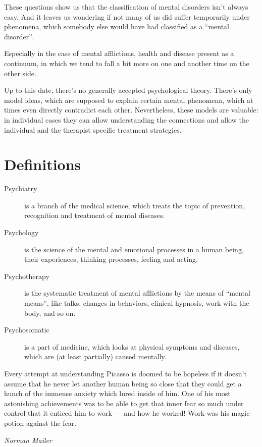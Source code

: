 \documentclass[../main.tex]{subfiles}
\begin{document}
These questions show us that the classification of mental disorders isn't always easy.
And it leaves us wondering if not many of us did suffer temporarily under phenomena,
which somebody else would have had classified as a ``mental disorder''.

Especially in the case of mental afflictions, health and disease present as a continuum,
in which we tend to fall a bit more on one and another time on the other side.

Up to this date, there's no generally accepted psychological theory.
There's only model ideas, which are supposed to explain certain mental phenomena,
which at times even directly contradict each other.
Nevertheless, these models are valuable: in individual cases  they can allow understanding
the connections and allow the individual and the therapist specific treatment strategies.

\section{Definitions}

\begin{description}
\item[Psychiatry] is a branch of the medical science, which treats the topic of
  prevention, recognition and treatment of mental diseases.
\item[Psychology] is the science of the mental and emotional processes in a human being,
  their experiences, thinking processes, feeling and acting.
\item[Psychotherapy] is the systematic treatment of mental afflictions by the means of
  ``mental means'', like talks, changes in behaviors, clinical hypnosis, work with the body, and so on.
\item[Psychosomatic] is a part of medicine, which looks at physical symptoms and diseases, which are
  (at least partially) caused mentally.
  \end{description}

\setlength{}

\epigraph{Every attempt at understanding Picasso is doomed to be hopeless if it doesn't assume that he never let another human being so close that they could get a hunch of the immense anxiety which lured inside of him. One of his most astonishing achievements was to be able to get that inner fear so much under control that it enticed him to work  --- and how he worked! Work was his magic potion against the fear.}{\textit{Norman Mailer}}
\end{document}
